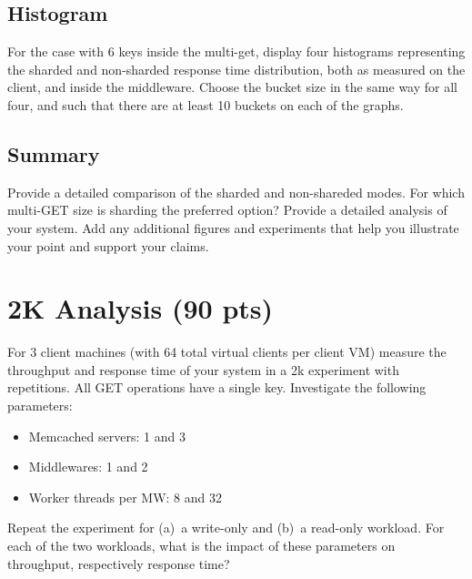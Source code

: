 \documentclass[11pt,a4paper]{article}
\begin{document}
\subsection{Histogram}

For the case with 6 keys inside the multi-get, display four histograms representing the sharded and non-sharded response time distribution, both as measured on the client, and inside the middleware. Choose the bucket size in the same way for all four, and such that there are at least 10 buckets on each of the graphs.

\subsection{Summary}

Provide a detailed comparison of the sharded and non-shareded modes. For which multi-GET size is sharding the preferred option? Provide a detailed analysis of your system. Add any additional figures and experiments that help you illustrate your point and support your claims.

\section{2K Analysis (90 pts)}

For 3 client machines (with 64 total virtual clients per client VM) measure the throughput and response time of your system in a 2k experiment with repetitions. All GET operations have a single key. Investigate the following parameters:

\begin{itemize}
		
	\item Memcached servers: 1 and 3
	\item Middlewares: 1 and 2
	\item Worker threads per MW: 8 and 32
	      	      
\end{itemize}

Repeat the experiment for (a)~a write-only and (b)~a read-only workload.
For each of the two workloads, what is the impact of these parameters on throughput, respectively response time?
\end{document}
